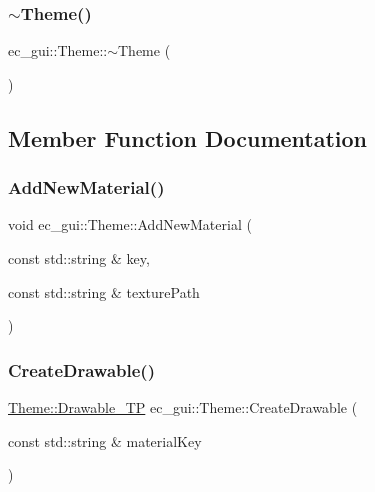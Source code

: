 \mbox{\label{classec__gui_1_1_theme_a49f870526859d679091067ee73e9881e}} 
\subsubsection{\texorpdfstring{$\sim$\+Theme()}{~Theme()}}
{\footnotesize\ttfamily ec\+\_\+gui\+::\+Theme\+::$\sim$\+Theme (\begin{DoxyParamCaption}{ }\end{DoxyParamCaption})\hspace{0.3cm}{\ttfamily [virtual]}}



\subsection{Member Function Documentation}
\mbox{\label{classec__gui_1_1_theme_a019c4706c8fc1ce44bb167d363506b5b}} 
\subsubsection{\texorpdfstring{Add\+New\+Material()}{AddNewMaterial()}}
{\footnotesize\ttfamily void ec\+\_\+gui\+::\+Theme\+::\+Add\+New\+Material (\begin{DoxyParamCaption}\item[{const std\+::string \&}]{key,  }\item[{const std\+::string \&}]{texture\+Path }\end{DoxyParamCaption})\hspace{0.3cm}{\ttfamily [protected]}}

\mbox{\label{classec__gui_1_1_theme_aeb8406fe5324c6fe494dc948f0d60b71}} 
\subsubsection{\texorpdfstring{Create\+Drawable()}{CreateDrawable()}}
{\footnotesize\ttfamily \mbox{\hyperlink{classec__gui_1_1_theme_a91d9c5c68bc50cc0f1470d141a6a231b}{Theme\+::\+Drawable\+\_\+\+TP}} ec\+\_\+gui\+::\+Theme\+::\+Create\+Drawable (\begin{DoxyParamCaption}\item[{const std\+::string \&}]{material\+Key }\end{DoxyParamCaption})\hspace{0.3cm}{\ttfamily [protected]}}



